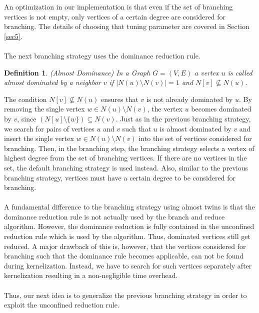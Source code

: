 \documentclass[]{article}
\newtheorem{definition}{Definition}
\begin{document}
An optimization in our implementation is that even if the set of branching vertices is not empty, only vertices of a certain degree are considered for branching. The details of choosing that tuning parameter are covered in Section \ref{sec5}.

\paragraph{}
The next branching strategy uses the dominance reduction rule.

\begin{definition} (Almost Dominance)
	In a Graph $G=(V,E)$ a vertex $u$ is called almost dominated by a neighbor $v$ if $|N(u)\setminus N(v)| = 1$ and $N[v]\not\subseteq N(u)$.
\end{definition}
The condition $N[v]\not\subseteq N(u)$ ensures that $v$ is not already dominated by $u$. By removing the single vertex $w\in N(u)\setminus N(v)$, the vertex $u$ becomes dominated by $v$, since $(N[u]\setminus\{w\})\subseteq N(v)$. Just as in the previous branching strategy, we search for pairs of vertices $u$ and $v$ such that $u$ is almost dominated by $v$ and insert the single vertex $w \in N(u)\setminus N(v)$ into the set of vertices considered for branching. Then, in the branching step, the branching strategy selects a vertex of highest degree from the set of branching vertices. If there are no vertices in the set, the default branching strategy is used instead. Also, similar to the previous branching strategy, vertices must have a certain degree to be considered for branching.

\paragraph{}
A fundamental difference to the branching strategy using almost twins is that the dominance reduction rule is not actually used by the branch and reduce algorithm. However, the dominance reduction is fully contained in the unconfined reduction rule which is used by the algorithm. Thus, dominated vertices still get reduced. A major drawback of this is, however, that the vertices considered for branching such that the dominance rule becomes applicable, can not be found during kernelization. Instead, we have to search for such vertices separately after kernelization resulting in a non-negligible time overhead. 

\paragraph{}
Thus, our next idea is to generalize the previous branching strategy in order to exploit the unconfined reduction rule.
\end{document}

